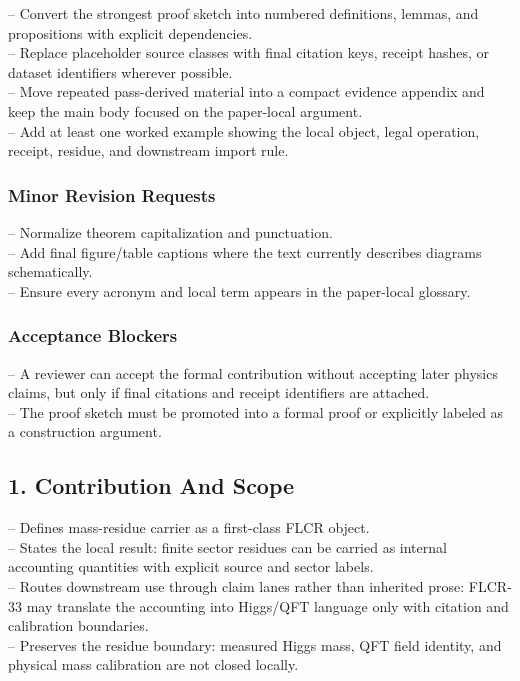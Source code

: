 \documentclass[11pt]{article}
\begin{document}
\noindent{}-- Convert the strongest proof sketch into numbered definitions, lemmas, and propositions with explicit dependencies.\\
\noindent{}-- Replace placeholder source classes with final citation keys, receipt hashes, or dataset identifiers wherever possible.\\
\noindent{}-- Move repeated pass-derived material into a compact evidence appendix and keep the main body focused on the paper-local argument.\\
\noindent{}-- Add at least one worked example showing the local object, legal operation, receipt, residue, and downstream import rule.\\

\subsubsection*{Minor Revision Requests}

\noindent{}-- Normalize theorem capitalization and punctuation.\\
\noindent{}-- Add final figure/table captions where the text currently describes diagrams schematically.\\
\noindent{}-- Ensure every acronym and local term appears in the paper-local glossary.\\

\subsubsection*{Acceptance Blockers}

\noindent{}-- A reviewer can accept the formal contribution without accepting later physics claims, but only if final citations and receipt identifiers are attached.\\
\noindent{}-- The proof sketch must be promoted into a formal proof or explicitly labeled as a construction argument.\\


\subsection*{1. Contribution And Scope}

\noindent{}-- Defines mass-residue carrier as a first-class FLCR object.\\
\noindent{}-- States the local result: finite sector residues can be carried as internal accounting quantities with explicit source and sector labels.\\
\noindent{}-- Routes downstream use through claim lanes rather than inherited prose: FLCR-33 may translate the accounting into Higgs/QFT language only with citation and calibration boundaries.\\
\noindent{}-- Preserves the residue boundary: measured Higgs mass, QFT field identity, and physical mass calibration are not closed locally.\\
\end{document}
